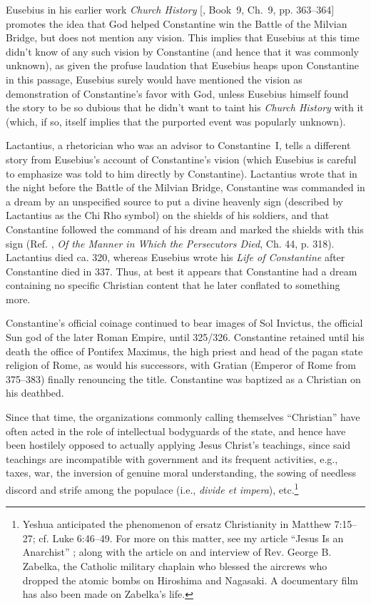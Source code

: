 \documentclass[letterpaper,12pt]{article}
\begin{document}
{    Eusebius in his earlier work \emph{Church History} [, Book~9, Ch.~9, pp. 363--364] promotes the idea that God helped Constantine win the Battle of the Milvian Bridge, but does not mention any vision. This implies that Eusebius at this time didn't know of any such vision by Constantine (and hence that it was commonly unknown), as given the profuse laudation that Eusebius heaps upon Constantine in this passage, Eusebius surely would have mentioned the vision as demonstration of Constantine's favor with God, unless Eusebius himself found the story to be so dubious that he didn't want to taint his \emph{Church History} with it (which, if so, itself implies that the purported event was popularly unknown).\par
    Lactantius, a rhetorician who was an advisor to Constantine~I, tells a different story from Eusebius's account of Constantine's vision (which Eusebius is careful to emphasize was told to him directly by Constantine). Lactantius wrote that in the night before the Battle of the Milvian Bridge, Constantine was commanded in a dream by an unspecified source to put a divine heavenly sign (described by Lactantius as the Chi Rho symbol) on the shields of his soldiers, and that Constantine followed the command of his dream and marked the shields with this sign (Ref. , \emph{Of the Manner in Which the Persecutors Died}, Ch. 44, p. 318). Lactantius died ca. 320, whereas Eusebius wrote his \emph{Life of Constantine} after Constantine died in 337. Thus, at best it appears that Constantine had a dream containing no specific Christian content that he later conflated to something more.\par
    Constantine's official coinage continued to bear images of Sol Invictus, the official Sun god of the later Roman Empire, until 325\slash 326. Constantine retained until his death the office of Pontifex Maximus, the high priest and head of the pagan state religion of Rome, as would his successors, with Gratian (Emperor of Rome from 375--383) finally renouncing the title. Constantine was baptized as a Christian on his deathbed.} Since that time, the organizations commonly calling themselves ``Christian'' have often acted in the role of intellectual bodyguards of the state, and hence have been hostilely opposed to actually applying Jesus Christ's teachings, since said teachings are incompatible with government and its frequent activities, e.g., taxes, war, the inversion of genuine moral understanding, the sowing of needless discord and strife among the populace (i.e., \emph{divide et impera}), etc.\footnote{Yeshua anticipated the phenomenon of ersatz Christianity in Matthew 7:15--27; cf. Luke 6:46--49. For more on this matter, see my article ``Jesus Is an Anarchist'' \cite{Redford2001}; along with the article \cite{McCarthy2003} on and interview \cite{McCarthy1984} of Rev. George B. Zabelka, the Catholic military chaplain who blessed the aircrews who dropped the atomic bombs on Hiroshima and Nagasaki. A documentary film \cite{Gavigan2006} has also been made on Zabelka's life.}
\end{document}
